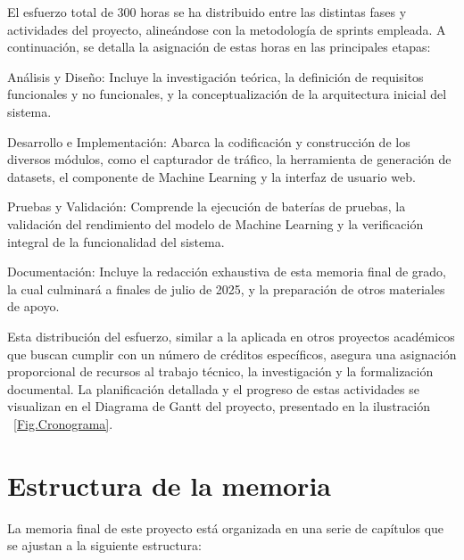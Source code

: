 El esfuerzo total de 300 horas se ha distribuido entre las distintas fases y actividades del proyecto, alineándose con la metodología de sprints empleada. A continuación, se detalla la asignación de estas horas en las principales etapas:

Análisis y Diseño: Incluye la investigación teórica, la definición de requisitos funcionales y no funcionales, y la conceptualización de la arquitectura inicial del sistema.

Desarrollo e Implementación: Abarca la codificación y construcción de los diversos módulos, como el capturador de tráfico, la herramienta de generación de datasets, el componente de Machine Learning y la interfaz de usuario web.

Pruebas y Validación: Comprende la ejecución de baterías de pruebas, la validación del rendimiento del modelo de Machine Learning y la verificación integral de la funcionalidad del sistema.

Documentación: Incluye la redacción exhaustiva de esta memoria final de grado, la cual culminará a finales de julio de 2025, y la preparación de otros materiales de apoyo.

Esta distribución del esfuerzo, similar a la aplicada en otros proyectos académicos que buscan cumplir con un número de créditos específicos, asegura una asignación proporcional de recursos al trabajo técnico, la investigación y la formalización documental. La planificación detallada y el progreso de estas actividades se visualizan en el Diagrama de Gantt del proyecto, presentado en la ilustración ~\ref{Fig.Cronograma}.

\section{Estructura de la memoria}
La memoria final de este proyecto está organizada en una serie de capítulos que se ajustan a la siguiente estructura:

